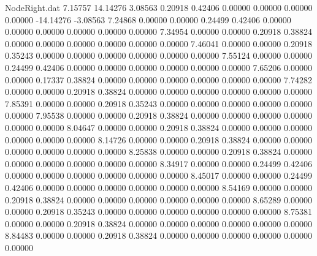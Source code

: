 \begin{filecontents}{NodeRight.dat}
   7.15757   14.14276    3.08563     0.20918    0.42406    0.00000    0.00000    0.00000    0.00000  -14.14276   -3.08563
   7.24868    0.00000    0.00000     0.24499    0.42406    0.00000    0.00000    0.00000    0.00000    0.00000    0.00000
   7.34954    0.00000    0.00000     0.20918    0.38824    0.00000    0.00000    0.00000    0.00000    0.00000    0.00000
   7.46041    0.00000    0.00000     0.20918    0.35243    0.00000    0.00000    0.00000    0.00000    0.00000    0.00000
   7.55124    0.00000    0.00000     0.24499    0.42406    0.00000    0.00000    0.00000    0.00000    0.00000    0.00000
   7.65206    0.00000    0.00000     0.17337    0.38824    0.00000    0.00000    0.00000    0.00000    0.00000    0.00000
   7.74282    0.00000    0.00000     0.20918    0.38824    0.00000    0.00000    0.00000    0.00000    0.00000    0.00000
   7.85391    0.00000    0.00000     0.20918    0.35243    0.00000    0.00000    0.00000    0.00000    0.00000    0.00000
   7.95538    0.00000    0.00000     0.20918    0.38824    0.00000    0.00000    0.00000    0.00000    0.00000    0.00000
   8.04647    0.00000    0.00000     0.20918    0.38824    0.00000    0.00000    0.00000    0.00000    0.00000    0.00000
   8.14726    0.00000    0.00000     0.20918    0.38824    0.00000    0.00000    0.00000    0.00000    0.00000    0.00000
   8.25838    0.00000    0.00000     0.20918    0.38824    0.00000    0.00000    0.00000    0.00000    0.00000    0.00000
   8.34917    0.00000    0.00000     0.24499    0.42406    0.00000    0.00000    0.00000    0.00000    0.00000    0.00000
   8.45017    0.00000    0.00000     0.24499    0.42406    0.00000    0.00000    0.00000    0.00000    0.00000    0.00000
   8.54169    0.00000    0.00000     0.20918    0.38824    0.00000    0.00000    0.00000    0.00000    0.00000    0.00000
   8.65289    0.00000    0.00000     0.20918    0.35243    0.00000    0.00000    0.00000    0.00000    0.00000    0.00000
   8.75381    0.00000    0.00000     0.20918    0.38824    0.00000    0.00000    0.00000    0.00000    0.00000    0.00000
   8.84483    0.00000    0.00000     0.20918    0.38824    0.00000    0.00000    0.00000    0.00000    0.00000    0.00000
\end{filecontents}
